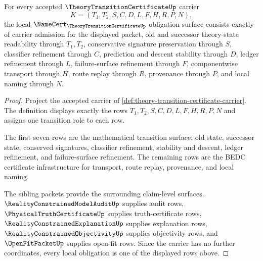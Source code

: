 \begin{theorem}
\label{thm:theory-transition-certificate-namecert-obligations}
For every accepted $\TheoryTransitionCertificateUp$ carrier
$$
K=(T_1,T_2,S,C,D,L,F,H,R,P,N),
$$
the local $\NameCert_{\TheoryTransitionCertificateUp}$ obligation surface consists exactly of carrier admission for the displayed packet, old and successor theory-state readability through $T_1,T_2$, conservative signature preservation through $S$, classifier refinement through $C$, prediction and descent stability through $D$, ledger refinement through $L$, failure-surface refinement through $F$, componentwise transport through $H$, route replay through $R$, provenance through $P$, and local naming through $N$.
\end{theorem}
\begin{proof}
Project the accepted carrier of \autoref{def:theory-transition-certificate-carrier}. The definition displays exactly the rows $T_1,T_2,S,C,D,L,F,H,R,P,N$ and assigns one transition role to each row.

The first seven rows are the mathematical transition surface: old state, successor state, conserved signatures, classifier refinement, stability and descent, ledger refinement, and failure-surface refinement. The remaining rows are the BEDC certificate infrastructure for transport, route replay, provenance, and local naming.

The sibling packets provide the surrounding claim-level surfaces. $\RealityConstrainedModelAuditUp$ supplies audit rows, $\PhysicalTruthCertificateUp$ supplies truth-certificate rows, $\RealityConstrainedExplanationUp$ supplies explanation rows, $\RealityConstrainedObjectivityUp$ supplies objectivity rows, and $\OpenFitPacketUp$ supplies open-fit rows. Since the carrier has no further coordinates, every local obligation is one of the displayed rows above.
\end{proof}

